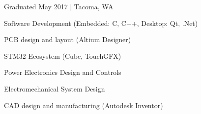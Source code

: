 \documentclass[letterpaper]{deedy-resume} %
\begin{document}
\begin{minipage}[t]{0.33\textwidth}
Graduated May 2017 | Tacoma, WA

\sectionspace %

\sectionspace %

\begin{tightitemize}

\item
Software Development \newline(Embedded: C, C++, \newline Desktop: Qt, .Net)

\item
PCB design and layout (Altium Designer)

\item
STM32 Ecosystem (Cube, TouchGFX)

\item
Power Electronics Design and Controls

\item
Electromechanical System Design

\item
CAD design and manufacturing (Autodesk Inventor)

\end{tightitemize}

\sectionspace
{}
\end{minipage} %
\hfill
%
%
\end{document}
